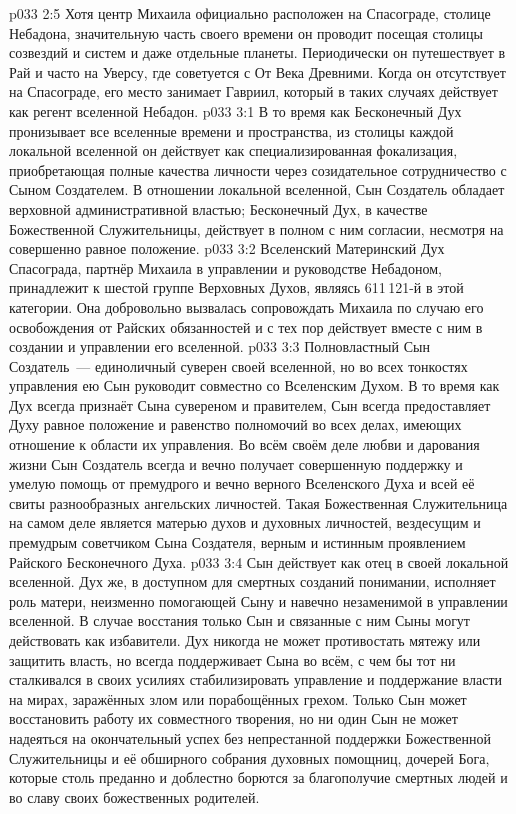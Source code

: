 \vs p033 2:5 \pc Хотя центр Михаила официально расположен на Спасограде, столице Небадона, значительную часть своего времени он проводит посещая столицы созвездий и систем и даже отдельные планеты. Периодически он путешествует в Рай и часто на Уверсу, где советуется с От Века Древними. Когда он отсутствует на Спасограде, его место занимает Гавриил, который в таких случаях действует как регент вселенной Небадон.
\vs p033 3:1 В то время как Бесконечный Дух пронизывает все вселенные времени и пространства, из столицы каждой локальной вселенной он действует как специализированная фокализация, приобретающая полные качества личности через созидательное сотрудничество с Сыном Создателем. В отношении локальной вселенной, Сын Создатель обладает верховной административной властью; Бесконечный Дух, в качестве Божественной Служительницы, действует в полном с ним согласии, несмотря на совершенно равное положение.
\vs p033 3:2 \pc Вселенский Материнский Дух Спасограда, партнёр Михаила в управлении и руководстве Небадоном, принадлежит к шестой группе Верховных Духов, являясь 611\,121-й в этой категории. Она добровольно вызвалась сопровождать Михаила по случаю его освобождения от Райских обязанностей и с тех пор действует вместе с ним в создании и управлении его вселенной.
\vs p033 3:3 \pc Полновластный Сын Создатель~--- единоличный суверен своей вселенной, но во всех тонкостях управления ею Сын руководит совместно со Вселенским Духом. В то время как Дух всегда признаёт Сына сувереном и правителем, Сын всегда предоставляет Духу равное положение и равенство полномочий во всех делах, имеющих отношение к области их управления. Во всём своём деле любви и дарования жизни Сын Создатель всегда и вечно получает совершенную поддержку и умелую помощь от премудрого и вечно верного Вселенского Духа и всей её свиты разнообразных ангельских личностей. Такая Божественная Служительница на самом деле является матерью духов и духовных личностей, вездесущим и премудрым советчиком Сына Создателя, верным и истинным проявлением Райского Бесконечного Духа.
\vs p033 3:4 \pc Сын действует как отец в своей локальной вселенной. Дух же, в доступном для смертных созданий понимании, исполняет роль матери, неизменно помогающей Сыну и навечно незаменимой в управлении вселенной. В случае восстания только Сын и связанные с ним Сыны могут действовать как избавители. Дух никогда не может противостать мятежу или защитить власть, но всегда поддерживает Сына во всём, с чем бы тот ни сталкивался в своих усилиях стабилизировать управление и поддержание власти на мирах, заражённых злом или порабощённых грехом. Только Сын может восстановить работу их совместного творения, но ни один Сын не может надеяться на окончательный успех без непрестанной поддержки Божественной Служительницы и её обширного собрания духовных помощниц, дочерей Бога, которые столь преданно и доблестно борются за благополучие смертных людей и во славу своих божественных родителей.
